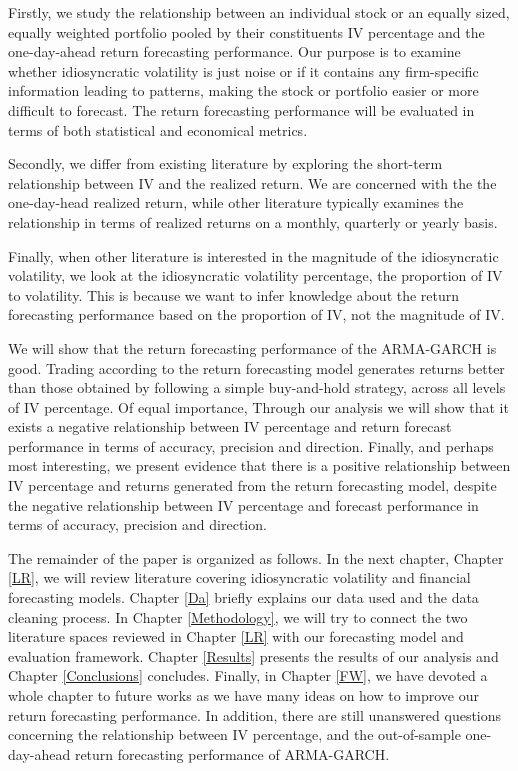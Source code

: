 Firstly, we study the relationship between an individual stock or an equally sized, equally weighted portfolio pooled by their constituents IV percentage and the one-day-ahead return forecasting performance. Our purpose is to examine whether idiosyncratic volatility is just noise or if it contains any firm-specific information leading to patterns, making the stock or portfolio easier or more difficult to forecast. The return forecasting performance will be evaluated in terms of both statistical and economical metrics.

Secondly, we differ from existing literature by exploring the short-term relationship between IV and the realized return. We are concerned with the the one-day-head realized return, while other literature typically examines the relationship in terms of realized returns on a monthly, quarterly or yearly basis.

Finally, when other literature is interested in the magnitude of the idiosyncratic volatility, we look at the idiosyncratic volatility percentage, the proportion of IV to volatility. This is because we want to infer knowledge about the return forecasting performance based on the proportion of IV, not the magnitude of IV.

We will show that the return forecasting performance of the ARMA-GARCH is good. Trading according to the return forecasting model generates returns better than those obtained by following a simple buy-and-hold strategy, across all levels of IV percentage. Of equal importance, Through our analysis we will show that it exists a negative relationship between IV percentage and return forecast performance in terms of accuracy, precision and direction. Finally, and perhaps most interesting, we present evidence that there is a positive relationship between IV percentage and returns generated from the return forecasting model, despite the negative relationship between IV percentage and forecast performance in terms of accuracy, precision and direction. 

The remainder of the paper is organized as follows. In the next chapter, Chapter \ref{LR}, we will review literature covering idiosyncratic volatility and financial forecasting models. Chapter \ref{Da} briefly explains our data used and the data cleaning process. In Chapter \ref{Methodology}, we will try to connect the two literature spaces reviewed in Chapter \ref{LR} with our forecasting model and evaluation framework. Chapter \ref{Results} presents the results of our analysis and Chapter \ref{Conclusions} concludes. Finally, in Chapter \ref{FW}, we have devoted a whole chapter to future works as we have many ideas on how to improve our return forecasting performance. In addition, there are still unanswered questions concerning the relationship between IV percentage, and the out-of-sample one-day-ahead return forecasting performance of ARMA-GARCH.


